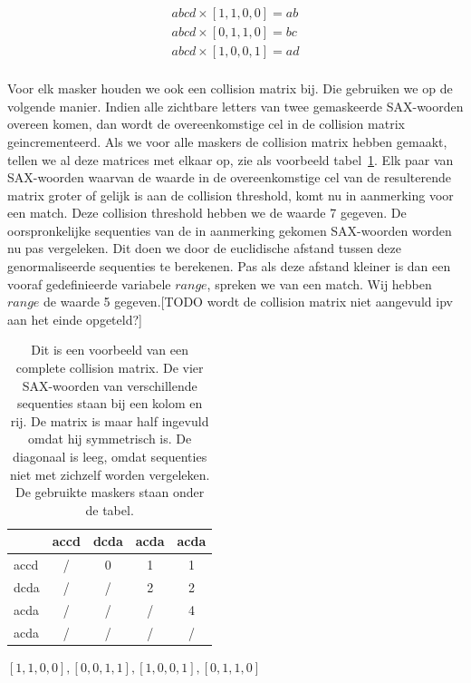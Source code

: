 \documentclass{article}
\begin{document}
\begin{equation}
\label{seq:maskering}
\begin{aligned}
abcd \times [1,1,0,0] = ab \\
abcd \times [0,1,1,0] = bc \\
abcd \times [1,0,0,1] = ad \\
\end{aligned} 
\end{equation}

Voor elk masker houden we ook een collision matrix bij. Die gebruiken we op de volgende manier. Indien alle zichtbare letters van twee gemaskeerde SAX-woorden overeen komen, dan wordt de overeenkomstige cel in de collision matrix geincrementeerd. Als we voor alle maskers de collision matrix hebben gemaakt, tellen we al deze matrices met elkaar op, zie als voorbeeld tabel~\ref{tab:collision_matrix}. Elk paar van SAX-woorden waarvan de waarde in de overeenkomstige cel van de resulterende matrix groter of gelijk is aan de collision threshold, komt nu in aanmerking voor een match. Deze collision threshold hebben we de waarde 7 gegeven. De oorspronkelijke sequenties van de in aanmerking gekomen SAX-woorden worden nu pas vergeleken. Dit doen we door de euclidische afstand tussen deze genormaliseerde sequenties te berekenen. Pas als deze afstand kleiner is dan een vooraf gedefinieerde variabele $range$, spreken we van een match. Wij hebben $range$ de waarde 5 gegeven.[TODO wordt de collision matrix niet aangevuld ipv aan het einde opgeteld?]


\begin{table}
\caption{Dit is een voorbeeld van een complete collision matrix. De vier SAX-woorden van verschillende sequenties staan bij een kolom en rij. De matrix is maar half ingevuld omdat hij symmetrisch is.  De diagonaal is leeg, omdat sequenties niet met zichzelf worden vergeleken. De gebruikte maskers staan onder de tabel.}
\label{tab:collision_matrix}
\centering
\begin{tabular}{ l || c | c | c | c }
& accd & dcda & acda & acda \\ \hline
\hline
accd & / & 0 & 1 & 1 \\ \hline
dcda & / & / & 2 & 2 \\ \hline
acda & / & / & / & 4 \\ \hline
acda & / & / & / & / \\
\hline
\end{tabular}\par

$[1,1,0,0], [0,0,1,1], [1,0,0,1], [0,1,1,0]$
\end{table}
\end{document}
